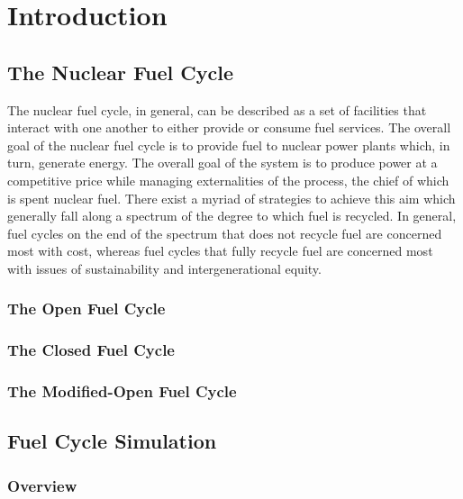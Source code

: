 \chapter{Introduction}\label{ch:intro}

\section{The Nuclear Fuel Cycle}

The nuclear fuel cycle, in general, can be described as a set of facilities that
interact with one another to either provide or consume fuel services. The
overall goal of the nuclear fuel cycle is to provide fuel to nuclear power
plants which, in turn, generate energy. The overall goal of the system is to
produce power at a competitive price while managing externalities of the
process, the chief of which is spent nuclear fuel. There exist a myriad of
strategies to achieve this aim which generally fall along a spectrum of the
degree to which fuel is recycled. In general, fuel cycles on the end of the
spectrum that does not recycle fuel are concerned most with cost, whereas fuel
cycles that fully recycle fuel are concerned most with issues of sustainability
and intergenerational equity.

\subsection{The Open Fuel Cycle}


\subsection{The Closed Fuel Cycle}


\subsection{The Modified-Open Fuel Cycle}


\section{Fuel Cycle Simulation}

\subsection{Overview}\label{sec:simulators-overview}


